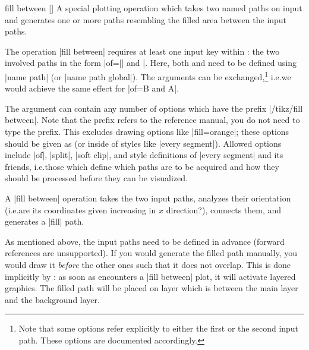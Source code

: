 \begin{addplotoperation}[]{fill between}{%
    []
}
    A special plotting operation which takes two named paths on input and
    generates one or more paths resembling the filled area between the input
    paths.
\begin{codeexample}[]
\end{codeexample}
    The operation |fill between| requires at least one input key within
    :
    the two involved paths in the form |of=|| and |.
    Here, both  and  need to be defined using
    |name path| (or |name path global|). The arguments can be
    exchanged,\footnote{Note that some options refer explicitly to either the
    first or the second input path. These options are documented accordingly.}
    i.e.\@ we would achieve the same effect for |of=B and A|.

    The argument  can contain any number of options
    which have the prefix |/tikz/fill between|. Note that the prefix refers to
    the reference manual, you do not need to type the prefix. This excludes
    drawing options like |fill=orange|; these options should be given as
     (or inside of styles like |every segment|). Allowed options
    include |of|, |split|, |soft clip|, and style definitions of
    |every segment| and its friends, i.e.\@ those which define which paths are
    to be acquired and how they should be processed before they can be
    visualized.

    A |fill between| operation takes the two input paths, analyzes their
    orientation (i.e.\@ are its coordinates given increasing in $x$
    direction?), connects them, and generates a |fill| path.

    As mentioned above, the input paths need to be defined in advance (forward
    references are unsupported). If you would generate the filled path
    manually, you would draw it \emph{before} the other ones such that it does
    not overlap. This is done implicitly by \PGFPlots{}: as soon as \PGFPlots{}
    encounters a |fill between| plot, it will activate layered graphics. The
    filled path will be placed on layer  which is
    between the main layer and the background layer.


\end{addplotoperation}
